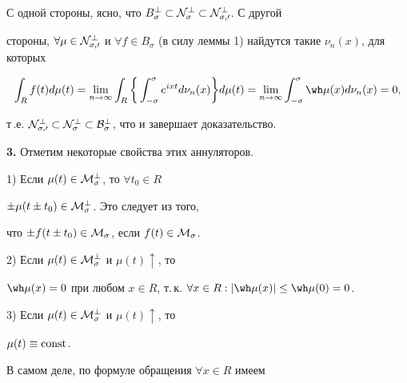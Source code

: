 \begin{pf} 


С одной стороны, ясно, что $B^\bot_\sigma\subset\cal 


N^\bot_\sigma\subset\cal N^\bot_{\sigma,0}$. С другой 


стороны, $\forall\mu\in\cal N^\bot_{\sigma,0}$ и $\forall f\in 


B_\sigma$ (в силу леммы 1) найдутся такие $\nu_n(x)$, для которых 


$$ 


\int_R f(t)d\mu(t)=\lim_{n\to\infty}\int_R\bigg\{ 


\int^\sigma_{-\sigma}


e^{ixt}d\nu_n(x)\bigg\}d\mu(t)=\lim_{n\to\infty} 


\int^\sigma_{-\sigma}\wh\mu(x)d\nu_n(x)=0, 


$$ 


т\,.е. $\cal N^\bot_{\sigma,0}\subset\cal N^\bot_\sigma\subset 


B^\bot_\sigma$, что и завершает доказательство. 


\end{pf} 


 


{\bf 3.} Отметим некоторые свойства этих аннуляторов. 


 


1) Если $\mu(t)\in\cal M^\bot_\sigma$, то $\forall t_0\in R$\; 


$\pm\mu(t\pm t_0)\in\cal M^\bot_\sigma$. Это следует из того, 


что $\pm f(t\pm t_0)\in\cal M_\sigma$, если $f(t)\in\cal M_\sigma$. 


 


2) Если $\mu(t)\in\cal M^\bot_\sigma$ и $\mu(t)\uparrow$, то 


$\wh\mu(x)=0$ при любом $x\in R$, т.\,к. $\forall x\in 


R:|\wh\mu(x)|\le\wh\mu(0)=0$. 


 


3) Если $\mu(t)\in\cal M^\bot_\sigma$ и $\mu(t)\uparrow$, то 


$\mu(t)\equiv\operatorname{const}$. 


 


В самом деле, по формуле обращения $\forall x\in R$ имеем 


